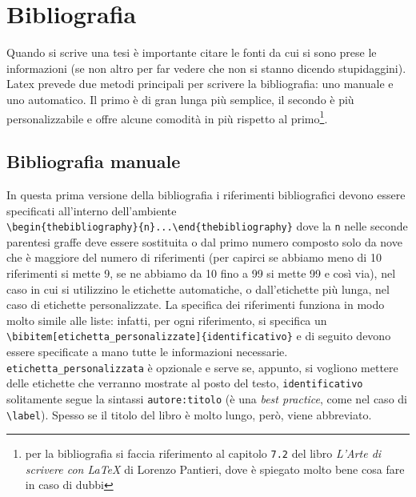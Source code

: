 \chapter{Bibliografia}
Quando si scrive una tesi è importante citare le fonti da cui si sono prese le
informazioni (se non altro per far vedere che non si stanno dicendo
stupidaggini). Latex prevede due metodi principali per scrivere la
bibliografia: uno manuale e uno automatico. Il primo è di gran lunga più
semplice, il secondo è più personalizzabile e offre alcune comodità in più
rispetto al primo\footnote{per la bibliografia si faccia riferimento al
capitolo \texttt{7.2} del libro \textit{L'Arte di scrivere con \LaTeX{}} di
Lorenzo Pantieri, dove è spiegato molto bene cosa fare in caso di dubbi}.

\section{Bibliografia manuale} \label{sec:bibman}
In questa prima versione della bibliografia i riferimenti bibliografici devono
essere specificati all'interno dell'ambiente \\
\verb!\begin{thebibliography}{n}...\end{thebibliography}! dove la \texttt{n}
nelle seconde parentesi graffe deve essere sostituita o dal primo numero
composto solo da nove che è maggiore del numero di riferimenti (per capirci se
abbiamo meno di 10 riferimenti si mette 9, se ne abbiamo da 10 fino a 99 si
mette 99 e così via), nel caso in cui si utilizzino le etichette automatiche,
o dall'etichette più lunga, nel caso di etichette personalizzate. La specifica
dei riferimenti funziona in modo molto simile alle liste: infatti, per ogni
riferimento, si specifica un
\verb!\bibitem[etichetta_personalizzate]{identificativo}! e di seguito devono
essere specificate a mano tutte le informazioni necessarie.
\verb!etichetta_personalizzata! è opzionale e serve se, appunto, si vogliono
mettere delle etichette che verranno mostrate al posto del testo,
\verb!identificativo! solitamente segue la sintassi \verb!autore:titolo! (è
una \textit{best practice}, come nel caso di \verb!\label!). Spesso se il
titolo del libro è molto lungo, però, viene abbreviato.

